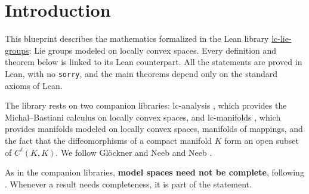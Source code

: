 \chapter{Introduction}
\label{chap:introduction}

This blueprint describes the mathematics formalized in the Lean library
\href{https://github.com/glaroton/lc-lie-groups}{lc-lie-groups}: Lie groups modeled on locally
convex spaces. Every definition and theorem below is linked to its Lean counterpart. All the
statements are proved in Lean, with no \texttt{sorry}, and the main theorems depend only on the
standard axioms of Lean.

The library rests on two companion libraries: lc-analysis \cite{LCA}, which provides the
Michal--Bastiani calculus on locally convex spaces, and lc-manifolds \cite{LCM}, which provides
manifolds modeled on locally convex spaces, manifolds of mappings, and the fact that the
diffeomorphisms of a compact manifold $K$ form an open subset of $C^\ell(K, K)$. We follow
Glöckner and Neeb \cite{GN26} and Neeb \cite{Nee06}.

As in the companion libraries, \textbf{model spaces need not be complete}, following
\cite{GN26}. Whenever a result needs completeness, it is part of the statement.
